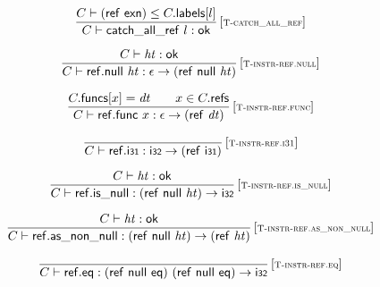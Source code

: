 $$
\begin{array}{@{}c@{}}\displaystyle
\frac{
C \vdash (\mathsf{ref}~\mathsf{exn}) \leq C{.}\mathsf{labels}{}[l]
}{
C \vdash \mathsf{catch\_all\_ref}~l : \mathsf{ok}
} \, {[\textsc{\scriptsize T{-}catch\_all\_ref}]}
\qquad
\end{array}
$$

\vspace{1ex}

$$
\begin{array}{@{}c@{}}\displaystyle
\frac{
C \vdash {\mathit{ht}} : \mathsf{ok}
}{
C \vdash \mathsf{ref{.}null}~{\mathit{ht}} : \epsilon \rightarrow (\mathsf{ref}~\mathsf{null}~{\mathit{ht}})
} \, {[\textsc{\scriptsize T{-}instr{-}ref.null}]}
\qquad
\end{array}
$$

$$
\begin{array}{@{}c@{}}\displaystyle
\frac{
C{.}\mathsf{funcs}{}[x] = {\mathit{dt}}
 \qquad
x \in C{.}\mathsf{refs}
}{
C \vdash \mathsf{ref{.}func}~x : \epsilon \rightarrow (\mathsf{ref}~{\mathit{dt}})
} \, {[\textsc{\scriptsize T{-}instr{-}ref.func}]}
\qquad
\end{array}
$$

$$
\begin{array}{@{}c@{}}\displaystyle
\frac{
}{
C \vdash \mathsf{ref{.}i{\scriptstyle 31}} : \mathsf{i{\scriptstyle 32}} \rightarrow (\mathsf{ref}~\mathsf{i{\scriptstyle 31}})
} \, {[\textsc{\scriptsize T{-}instr{-}ref.i31}]}
\qquad
\end{array}
$$

$$
\begin{array}{@{}c@{}}\displaystyle
\frac{
C \vdash {\mathit{ht}} : \mathsf{ok}
}{
C \vdash \mathsf{ref{.}is\_null} : (\mathsf{ref}~\mathsf{null}~{\mathit{ht}}) \rightarrow \mathsf{i{\scriptstyle 32}}
} \, {[\textsc{\scriptsize T{-}instr{-}ref.is\_null}]}
\qquad
\end{array}
$$

$$
\begin{array}{@{}c@{}}\displaystyle
\frac{
C \vdash {\mathit{ht}} : \mathsf{ok}
}{
C \vdash \mathsf{ref{.}as\_non\_null} : (\mathsf{ref}~\mathsf{null}~{\mathit{ht}}) \rightarrow (\mathsf{ref}~{\mathit{ht}})
} \, {[\textsc{\scriptsize T{-}instr{-}ref.as\_non\_null}]}
\qquad
\end{array}
$$

$$
\begin{array}{@{}c@{}}\displaystyle
\frac{
}{
C \vdash \mathsf{ref{.}eq} : (\mathsf{ref}~\mathsf{null}~\mathsf{eq})~(\mathsf{ref}~\mathsf{null}~\mathsf{eq}) \rightarrow \mathsf{i{\scriptstyle 32}}
} \, {[\textsc{\scriptsize T{-}instr{-}ref.eq}]}
\qquad
\end{array}
$$

